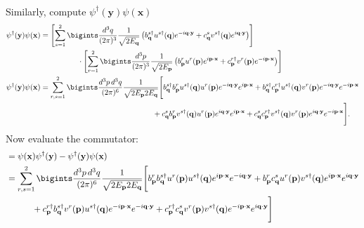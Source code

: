 {\begin{align*}
   \end{align*}
Similarly, compute $\psi^\dagger(\mathbf{y}) \psi(\mathbf{x})$
   \begin{align*}
       \psi^\dagger(\mathbf{y}) \psi(\mathbf{x}) &= \left[ \sum_{s=1}^2 \bigints\frac{d^3q}{(2\pi)^3} \frac{1}{\sqrt{2E_{\mathbf{q}}}} \left( b^{s\dagger}_{\mathbf{q}} u^{s\dagger}(\mathbf{q}) e^{-i \mathbf{q} \cdot \mathbf{y}} + c^s_{\mathbf{q}} v^{s\dagger}(\mathbf{q}) e^{i \mathbf{q} \cdot \mathbf{y}} \right) \right] \notag\\
       &\hspace{50pt}\cdot \left[ \sum_{r=1}^2 \bigints\frac{d^3p}{(2\pi)^3} \frac{1}{\sqrt{2E_{\mathbf{p}}}} \left( b^r_{\mathbf{p}} u^r(\mathbf{p}) e^{i \mathbf{p} \cdot \mathbf{x}} + c^{r\dagger}_{\mathbf{p}} v^r(\mathbf{p}) e^{-i \mathbf{p} \cdot \mathbf{x}} \right) \right]\notag\\
       \psi^\dagger(\mathbf{y}) \psi(\mathbf{x}) &= \sum_{r,s=1}^2 \bigints\frac{d^3p \, d^3q}{(2\pi)^6} \frac{1}{\sqrt{2E_{\mathbf{p}} 2E_{\mathbf{q}}}} \Bigg[ b^{s\dagger}_{\mathbf{q}} b^r_{\mathbf{p}} u^{s\dagger}(\mathbf{q}) u^r(\mathbf{p}) e^{-i \mathbf{q} \cdot \mathbf{y}} e^{i \mathbf{p} \cdot \mathbf{x}} + b^{s\dagger}_{\mathbf{q}} c^{r\dagger}_{\mathbf{p}} u^{s\dagger}(\mathbf{q}) v^r(\mathbf{p}) e^{-i \mathbf{q} \cdot \mathbf{y}} e^{-i \mathbf{p} \cdot \mathbf{x}} \\
       &\hspace{150pt} + c^s_{\mathbf{q}} b^r_{\mathbf{p}} v^{s\dagger}(\mathbf{q}) u^r(\mathbf{p}) e^{i \mathbf{q} \cdot \mathbf{y}} e^{i \mathbf{p} \cdot \mathbf{x}} + c^s_{\mathbf{q}} c^{r\dagger}_{\mathbf{p}} v^{s\dagger}(\mathbf{q}) v^r(\mathbf{p}) e^{i \mathbf{q} \cdot \mathbf{y}} e^{-i \mathbf{p} \cdot \mathbf{x}} \Bigg].
   \end{align*}
Now evaluate the commutator:
   \begin{align*}
       [\psi(\mathbf{x}), \psi^\dagger(\mathbf{y})] &= \psi(\mathbf{x}) \psi^\dagger(\mathbf{y}) - \psi^\dagger(\mathbf{y}) \psi(\mathbf{x}) \\
       &= \sum_{r,s=1}^2 \bigints\frac{d^3p \, d^3q}{(2\pi)^6} \frac{1}{\sqrt{2E_{\mathbf{p}} 2E_{\mathbf{q}}}} \Bigg[ b^r_{\mathbf{p}} b^{s\dagger}_{\mathbf{q}} u^r(\mathbf{p}) u^{s\dagger}(\mathbf{q}) e^{i \mathbf{p} \cdot \mathbf{x}} e^{-i \mathbf{q} \cdot \mathbf{y}} + b^r_{\mathbf{p}} c^s_{\mathbf{q}} u^r(\mathbf{p}) v^{s\dagger}(\mathbf{q}) e^{i \mathbf{p} \cdot \mathbf{x}} e^{i \mathbf{q} \cdot \mathbf{y}} \\
       &\hspace{30pt} + c^{r\dagger}_{\mathbf{p}} b^{s\dagger}_{\mathbf{q}} v^r(\mathbf{p}) u^{s\dagger}(\mathbf{q}) e^{-i \mathbf{p} \cdot \mathbf{x}} e^{-i \mathbf{q} \cdot \mathbf{y}} + c^{r\dagger}_{\mathbf{p}} c^s_{\mathbf{q}} v^r(\mathbf{p}) v^{s\dagger}(\mathbf{q}) e^{-i \mathbf{p} \cdot \mathbf{x}} e^{i \mathbf{q} \cdot \mathbf{y}} \Bigg] \\

\end{align*}}
